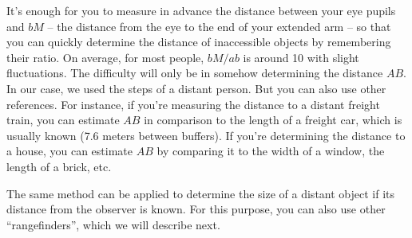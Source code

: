 It's enough for you to measure in advance the distance between your eye pupils and $bM$ -- the distance from the eye to the end of your extended arm -- so that you can quickly determine the distance of inaccessible objects by remembering their ratio. On average, for most people, $bM/ab$ is around 10 with slight fluctuations. The difficulty will only be in somehow determining the distance $AB$. In our case, we used the steps of a distant person. But you can also use other references. For instance, if you're measuring the distance to a distant freight train, you can estimate $AB$ in comparison to the length of a freight car, which is usually known (7.6 meters between buffers). If you're determining the distance to a house, you can estimate $AB$ by comparing it to the width of a window, the length of a brick, etc.

The same method can be applied to determine the size of a distant object if its distance from the observer is known. For this purpose, you can also use other ``rangefinders'', which we will describe next.

